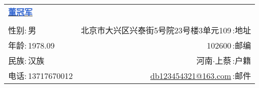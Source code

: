 \newcommand{\myheader}{
    \begin{tabular*}{\textwidth}{l@{\extracolsep{\fill}}r}
        \textbf{\href{https://herechen.github.io}{\LARGE \textcolor{highlight}{董冠军}}} \\
        \\
        {\color{blue}性别:}$\,$男 & 北京市大兴区兴泰街5号院23号楼3单元109$\,${\color{blue}:地址} \\
        {\color{blue}年龄:}$\,$1978.09 & 102600$\,${\color{blue}:邮编} \\
        {\color{blue}民族:}$\,$汉族 & 河南$\cdot$上蔡$\,${\color{blue}:户籍} \\
        {\color{blue}电话:}$\,$13717670012 & \href{mailto:db123454321@163.com}{db123454321@163.com}$\,${\color{blue}:邮件} \\
    \end{tabular*}\\\vspace{0.1in}}

\myheader
